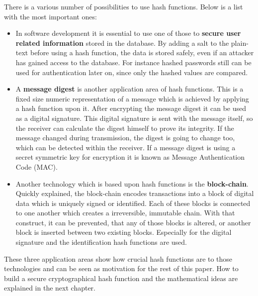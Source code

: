 \documentclass[a4paper,11pt, twoside]{article}
\begin{document}
There is a various number of possibilities to use hash functions. Below is a list with the most important ones: 
\begin{itemize}
    \item In software development it is essential to use one of those to \textbf{secure user related information} stored in the database. By adding a salt to the plain-text before using a hash function, the data is stored safely, even if an attacker has gained access to the database. For instance hashed passwords still can be used for authentication later on, since only the hashed values are compared.
    \item A \textbf{message digest} is another application area of hash functions. This is a fixed size numeric representation of a message which is achieved by applying a hash function upon it. After encrypting the message digest it can be used as a digital signature. This digital signature is sent with the message itself, so the receiver can calculate the digest himself to prove its integrity. If the message changed during transmission, the digest is going to change too, which can be detected within the receiver. If a message digest is using a secret symmetric key for encryption it is known as Message Authentication Code (MAC). \cite{message_digest}
    \item Another technology which is based upon hash functions is the \textbf{block-chain}. Quickly explained, the block-chain encodes transactions into a block of digital data which is uniquely signed or identified. Each of these blocks is connected to one another which creates a irreversible, immutable chain. With that construct, it can be prevented, that any of those blocks is altered, or another block is inserted between two existing blocks. Especially for the digital signature and the identification hash functions are used. \cite{blockchain}
\end{itemize}
These three application areas show how crucial hash functions are to those technologies and can be seen as motivation for the rest of this paper. How to build a secure cryptographical hash function and the mathematical ideas are explained in the next chapter. 
\end{document}
